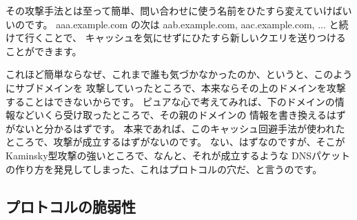 その攻撃手法とは至って簡単、問い合わせに使う名前をひたすら変えていけばいいのです。
aaa.example.com の次は aab.example.com, aac.example.com, ... と続けて行くことで、
キャッシュを気にせずにひたすら新しいクエリを送りつけることができます。

これほど簡単ならなぜ、これまで誰も気づかなかったのか、というと、このようにサブドメインを
攻撃していったところで、本来ならその上のドメインを攻撃することはできないからです。
ピュアな心で考えてみれば、下のドメインの情報などいくら受け取ったところで、その親のドメインの
情報を書き換えるはずがないと分かるはずです。
本来であれば、このキャッシュ回避手法が使われたところで、攻撃が成立するはずがないのです。
ない、はずなのですが、そこがKaminsky型攻撃の強いところで、なんと、それが成立するような
DNSパケットの作り方を発見してしまった、これはプロトコルの穴だ、と言うのです。

\subsection{プロトコルの脆弱性}


